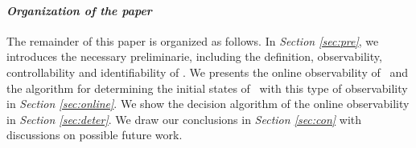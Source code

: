 






\paragraph*{\em Organization of the paper}
The remainder of this paper is organized as follows.
 In {\em Section \ref{sec:pre}}, we  introduces the necessary preliminarie, including the definition, observability, controllability and identifiability of \BCNs. We presents  the  online  observability of \BCNs\ and the algorithm for determining the initial states of \BCNs\ with this type of observability in {\em Section \ref{sec:online}}. We show  the  decision  algorithm of the online observability in {\em Section \ref{sec:deter}}.  We draw our conclusions in  {\em Section \ref{sec:con}} with discussions on possible future work.

